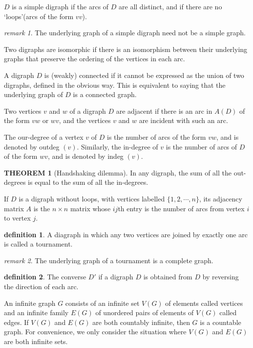 \documentclass[a4paper,11pt]{article}%
\theoremstyle{remark}
\newtheorem*{remark}{remark}
\theoremstyle{definition}
\newtheorem{theorem}{THEOREM}[section]
\theoremstyle{definition}
\theoremstyle{definition}
\theoremstyle{definition}
\newtheorem*{definition}{definition}
\theoremstyle{plain}
\theoremstyle{definition}
\begin{document}
$D$ is a simple digraph if the arcs of $D$ are all distinct, and if there 
are no `loops'(arcs of the form $vv$).
\begin{remark}
    The underlying graph of a simple digraph need not be a simple graph.
\end{remark}
Two digraphs are isomorphic if there is an isomorphism between their underlying graphs 
that preserve the ordering of the vertices in each arc.

A digraph $D$ is (weakly) connected if it cannot be expressed as the union 
of two digraphs, defined in the obvious way. This is equivalent to saying that the 
underlying graph of $D$ is a connected graph.

Two vertices $v$ and $w$ of a digraph $D$ are adjacent if there is an arc 
in $A(D)$ of the form $vw$ or $wv$, and the vertices $v$ and $w$ are incident
with such an arc.

The our-degree of a vertex $v$ of $D$ is the number of arcs of the form 
$vw$, and is denoted by outdeg $(v)$. Similarly, the in-degree of $v$ is the 
number of arcs of $D$ of the form $wv$, and is denoted by indeg $(v)$.

\begin{theorem}[Handshaking dilemma]
   In any digraph, the sum of all the out-degrees is equal to the sum of
   all the in-degrees. 
\end{theorem}
If $D$ is a digraph without loops, with vertices labelled $\{1,2,\cdots,n\}$,
its adjacency matrix $A$ is the $n\times n$ matrix whose $ij$th entry is the number 
of arcs from vertex $i$ to vertex $j$.
\begin{definition}
    A diagraph in which any two vertices are joined by exactly one arc is called
    a tournament.
\end{definition}
\begin{remark}
    The underlying graph of a tournament is a complete graph.
\end{remark}
\begin{definition}
    The converse $D'$ if a digraph $D$ is obtained from $D$ by reversing the 
    direction of each arc.
\end{definition}
An infinite graph $G$ consists of an infinite set $V(G)$ of elements called 
vertices and an infinite family $E(G)$ of unordered pairs of elements of 
$V(G)$ called edges. If $V(G)$ and $E(G)$ are both countably infinite, 
then $G$ is a countable graph. For convenience, we only 
consider the situation where $V(G)$ and $E(G)$ are both infinite sets.
\end{document}
